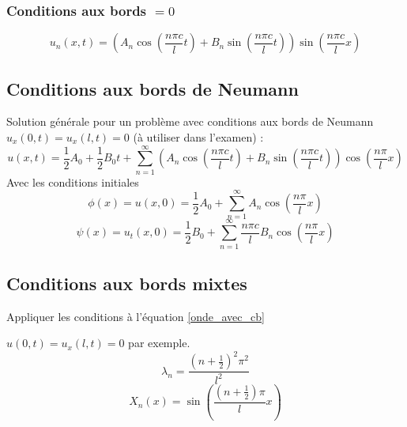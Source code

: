 \documentclass[resume]{subfiles}
\begin{document}
\subsubsection{Conditions aux bords $=0$}
\begin{scriptsize}
$$\boxed{u_n(x,t)=\left(A_n\cos\left(\frac{n\pi c}{l}t\right)+B_n\sin\left(\frac{n\pi c}{l}t\right)\right)\sin\left(\frac{n\pi c}{l}x\right)}$$
\end{scriptsize}
\subsection{Conditions aux bords de Neumann}
Solution générale pour un problème avec conditions aux bords de Neumann $u_x(0,t)=u_x(l,t)=0$ (à utiliser dans l'examen) :
$$\boxed{u(x,t)=\frac{1}{2}A_0+\frac{1}{2}B_0t+\sum_{n=1}^{\infty}\left(A_n\cos\left(\frac{n\pi c}{l}t\right)+B_n\sin\left(\frac{n\pi c}{l}t\right)\right)\cos\left(\frac{n\pi}{l}x\right)}$$
Avec les conditions initiales
$$\phi(x)=u(x,0)=\frac{1}{2}A_0+\sum_{n=1}^{\infty}A_n\cos\left(\frac{n\pi}{l}x\right)$$
$$\psi(x)=u_t(x,0)=\frac{1}{2}B_0+\sum_{n=1}^{\infty}\frac{n\pi c}{l}B_n\cos\left(\frac{n\pi}{l}x\right)$$
\subsection{Conditions aux bords mixtes}
Appliquer les conditions à l'équation \ref{onde_avec_cb}



$u(0,t)=u_x(l,t)=0$ par exemple.
$$\lambda_n=\frac{\left(n+\frac{1}{2}\right)^2\pi^2}{l^2}$$
$$X_n(x)=\sin\left(\frac{\left(n+\frac{1}{2}\right)\pi}{l}x\right)$$
\end{document}
